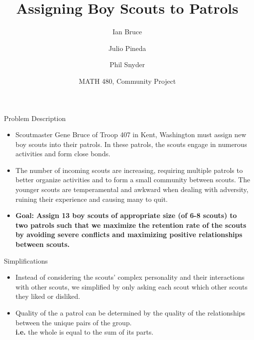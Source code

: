 \documentclass{beamer}
\title{Assigning Boy Scouts to Patrols}
\author{Ian Bruce \and Julio Pineda \and Phil Snyder}
\date{MATH 480, Community Project}
\begin{document}
\begin{frame}
  \titlepage
\end{frame}

\begin{frame}{Problem Description}%
	\begin{itemize}
		\item Scoutmaster Gene Bruce of Troop 407 in Kent, Washington must assign new boy scouts into their patrols. In these patrols, the scouts engage in numerous activities and form close bonds. \\
		\vspace{0.2in}
		\item The number of incoming scouts are increasing, requiring multiple patrols to better organize activities and to form a small community between scouts.
		The younger scouts are temperamental and awkward when dealing with adversity, ruining their experience and causing many to quit. \\
		\vspace{0.2in}
		\item \textbf{Goal:  Assign 13 boy scouts of appropriate size (of 6-8 scouts) to two patrols such that we maximize the retention rate of the scouts by avoiding severe conflicts and maximizing positive relationships between scouts.}
	\end{itemize}
\end{frame}

\begin{frame}{Simplifications}
	\begin{itemize}
		\item Instead of considering the scouts' complex personality and their interactions with other scouts, we simplified by only asking each scout which other scouts they liked or disliked.
		\vspace{0.5in}
		\item Quality of the a patrol can be determined by the quality of the relationships between the unique pairs of the group. \\
		\textbf{i.e.} the whole is equal to the sum of its parts.
	\end{itemize}
\end{frame}
\end{document}
